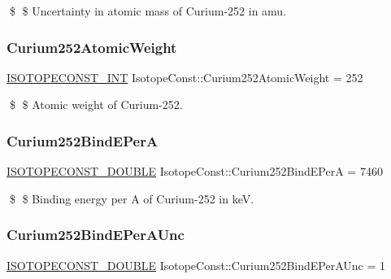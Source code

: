 \$ \$ Uncertainty in atomic mass of Curium-\/252 in amu. \mbox{\label{group___isotope_const-_curium-_cm252_gab32e04532def60a166bd28d512f60e3e}} 
\subsubsection{\texorpdfstring{Curium252\+Atomic\+Weight}{Curium252AtomicWeight}}
{\footnotesize\ttfamily \mbox{\hyperlink{group___isotope_const-_macros_ga5f18360b3e99483a35c32d789e62621c}{I\+S\+O\+T\+O\+P\+E\+C\+O\+N\+S\+T\+\_\+\+I\+NT}} Isotope\+Const\+::\+Curium252\+Atomic\+Weight = 252}

\$ \$ Atomic weight of Curium-\/252. \mbox{\label{group___isotope_const-_curium-_cm252_gaa59cc937f9d2df765217c79a591cd047}} 
\subsubsection{\texorpdfstring{Curium252\+Bind\+E\+PerA}{Curium252BindEPerA}}
{\footnotesize\ttfamily \mbox{\hyperlink{group___isotope_const-_macros_ga8f45a7272ce02c0b4c65c44636ed719a}{I\+S\+O\+T\+O\+P\+E\+C\+O\+N\+S\+T\+\_\+\+D\+O\+U\+B\+LE}} Isotope\+Const\+::\+Curium252\+Bind\+E\+PerA = 7460}

\$ \$ Binding energy per A of Curium-\/252 in keV. \mbox{\label{group___isotope_const-_curium-_cm252_ga334fbf44bccaadbbf0e1f33568637156}} 
\subsubsection{\texorpdfstring{Curium252\+Bind\+E\+Per\+A\+Unc}{Curium252BindEPerAUnc}}
{\footnotesize\ttfamily \mbox{\hyperlink{group___isotope_const-_macros_ga8f45a7272ce02c0b4c65c44636ed719a}{I\+S\+O\+T\+O\+P\+E\+C\+O\+N\+S\+T\+\_\+\+D\+O\+U\+B\+LE}} Isotope\+Const\+::\+Curium252\+Bind\+E\+Per\+A\+Unc = 1}

